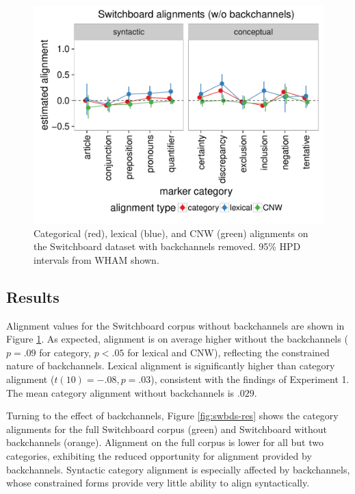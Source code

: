 \documentclass[11pt]{article}
\begin{document}
\begin{figure}[t]
  \begin{center}
    \includegraphics[width=\columnwidth]{results/swbdn_line.pdf}\vspace{-10pt}
  \end{center}
  \caption{Categorical (red), lexical (blue), and CNW (green) alignments on the Switchboard dataset with backchannels removed. 95\% HPD intervals from WHAM shown.}\label{fig:swbdn-res}
\end{figure}


\subsection{Results}

Alignment values for the Switchboard corpus without backchannels are shown in Figure \ref{fig:swbdn-res}. As expected, alignment is on average higher without the backchannels ($p=.09$ for category, $p<.05$ for lexical and CNW), reflecting the constrained nature of backchannels. Lexical alignment is significantly higher than category alignment ($t(10) =-.08, p = .03$), consistent with the findings of Experiment 1. The mean category alignment without backchannels is $.029$.

Turning to the effect of backchannels, Figure \ref{fig:swbds-res} shows the category alignments for the full Switchboard corpus (green) and Switchboard without backchannels (orange). Alignment on the full corpus is lower for all but two categories, exhibiting the reduced opportunity for alignment provided by backchannels. Syntactic category alignment is especially affected by backchannels, whose constrained forms provide very little ability to align syntactically.
\end{document}
